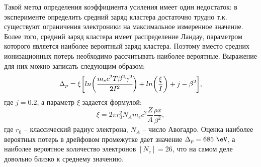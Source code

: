 \par Такой метод определения коэффициента усиления имеет один недостаток: в эксперименте определить средний заряд кластера достаточно трудно т.к. существуют ограничения электроники на максимальное измеренное значение. Более того, средний заряд кластера имеет распределение Ландау, параметром которого является наиболее вероятный заряд кластера. Поэтому вместо средних ионизационных потерь необходимо рассчитывать наиболее вероятные. Выражение для них можно записать следующим образом:
\begin{equation}
\Delta_p = \xi\biggl[ln \bigg(\cfrac{ m_ec^2T\beta^2\gamma^2}{2I^2}\bigg) + ln\bigg(\frac{\xi}{I}\bigg) + j - \beta^2 \biggr],
\label{eq:MP_energy_loss}
\end{equation}
где $j=0.2$, а параметр $\xi$ задается формулой:
\begin{equation}
\xi = 2\pi r_0^2 N_A m_ec^2\frac{Z}{A} \frac{\rho x} {\beta^2}, 
\end{equation}
где $r_0$ -- классический радиус электрона, $N_A$ -- число Авогадро. Оценка наиболее вероятных потерь в дрейфовом промежутке дает значение  $\Delta_p = 685~\eV$, а наиболее вероятное количество электронов $[N_e] = 26$, что на самом деле довольно близко к среднему значению.
